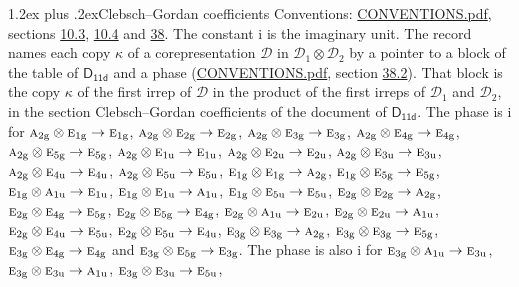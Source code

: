 \documentclass[10pt,a4paper]{article}
\makeatletter
\renewcommand\section{\@startsection{section}{1}{\z@}{-3ex plus -1ex minus -.2ex}%
  {1.2ex plus .2ex}{\normalfont\large\sffamily\bfseries\color{parttitle}}}
\numberwithin{equation}{section}
\newcommand{\grp}[1]{\mathsf{#1}}
\newcommand{\irr}[1]{\text{\normalfont\scshape #1}}
\newcommand{\ptag}[1]{\mathrm{#1}}
\newcommand{\iunit}{\mathrm{i}}
\newcommand{\irrprod}{\otimes}
\newcommand{\mult}{\kappa}
\makeatother
\begin{document}
\section{Clebsch--Gordan coefficients}\label{s:clebsch_gordan}
Conventions: \href{../../CONVENTIONS.pdf}{CONVENTIONS.pdf}, sections \href{../../../rotation/CONVENTIONS.pdf\#conv.10.3}{10.3}, \href{../../../rotation/CONVENTIONS.pdf\#conv.10.4}{10.4} and \href{../../CONVENTIONS.pdf\#conv.38}{38}.
The constant $\iunit$ is the imaginary unit.
\leavevmode\label{n:index.copy}The record names each copy $\mult$ of a corepresentation $\mathcal{D}$ in $\mathcal{D}_1\irrprod\mathcal{D}_2$ by a pointer to a block of the table of $\grp{D_{11d}}$ and a phase (\href{../../CONVENTIONS.pdf}{CONVENTIONS.pdf}, section \href{../../CONVENTIONS.pdf\#conv.38.2}{38.2}). That block is the copy $\mult$ of the first irrep of $\mathcal{D}$ in the product of the first irreps of $\mathcal{D}_1$ and $\mathcal{D}_2$, in the section Clebsch--Gordan coefficients of the document of \href{../../../rotation/data/pdf/D11d.pdf}{$\grp{D_{11d}}$}. The phase is $\iunit$ for $\irr{a}_{2\ptag{g}}\irrprod \irr{e}_{1\ptag{g}}\to \irr{e}_{1\ptag{g}}$, $\irr{a}_{2\ptag{g}}\irrprod \irr{e}_{2\ptag{g}}\to \irr{e}_{2\ptag{g}}$, $\irr{a}_{2\ptag{g}}\irrprod \irr{e}_{3\ptag{g}}\to \irr{e}_{3\ptag{g}}$, $\irr{a}_{2\ptag{g}}\irrprod \irr{e}_{4\ptag{g}}\to \irr{e}_{4\ptag{g}}$, $\irr{a}_{2\ptag{g}}\irrprod \irr{e}_{5\ptag{g}}\to \irr{e}_{5\ptag{g}}$, $\irr{a}_{2\ptag{g}}\irrprod \irr{e}_{1\ptag{u}}\to \irr{e}_{1\ptag{u}}$, $\irr{a}_{2\ptag{g}}\irrprod \irr{e}_{2\ptag{u}}\to \irr{e}_{2\ptag{u}}$, $\irr{a}_{2\ptag{g}}\irrprod \irr{e}_{3\ptag{u}}\to \irr{e}_{3\ptag{u}}$, $\irr{a}_{2\ptag{g}}\irrprod \irr{e}_{4\ptag{u}}\to \irr{e}_{4\ptag{u}}$, $\irr{a}_{2\ptag{g}}\irrprod \irr{e}_{5\ptag{u}}\to \irr{e}_{5\ptag{u}}$, $\irr{e}_{1\ptag{g}}\irrprod \irr{e}_{1\ptag{g}}\to \irr{a}_{2\ptag{g}}$, $\irr{e}_{1\ptag{g}}\irrprod \irr{e}_{5\ptag{g}}\to \irr{e}_{5\ptag{g}}$, $\irr{e}_{1\ptag{g}}\irrprod \irr{a}_{1\ptag{u}}\to \irr{e}_{1\ptag{u}}$, $\irr{e}_{1\ptag{g}}\irrprod \irr{e}_{1\ptag{u}}\to \irr{a}_{1\ptag{u}}$, $\irr{e}_{1\ptag{g}}\irrprod \irr{e}_{5\ptag{u}}\to \irr{e}_{5\ptag{u}}$, $\irr{e}_{2\ptag{g}}\irrprod \irr{e}_{2\ptag{g}}\to \irr{a}_{2\ptag{g}}$, $\irr{e}_{2\ptag{g}}\irrprod \irr{e}_{4\ptag{g}}\to \irr{e}_{5\ptag{g}}$, $\irr{e}_{2\ptag{g}}\irrprod \irr{e}_{5\ptag{g}}\to \irr{e}_{4\ptag{g}}$, $\irr{e}_{2\ptag{g}}\irrprod \irr{a}_{1\ptag{u}}\to \irr{e}_{2\ptag{u}}$, $\irr{e}_{2\ptag{g}}\irrprod \irr{e}_{2\ptag{u}}\to \irr{a}_{1\ptag{u}}$, $\irr{e}_{2\ptag{g}}\irrprod \irr{e}_{4\ptag{u}}\to \irr{e}_{5\ptag{u}}$, $\irr{e}_{2\ptag{g}}\irrprod \irr{e}_{5\ptag{u}}\to \irr{e}_{4\ptag{u}}$, $\irr{e}_{3\ptag{g}}\irrprod \irr{e}_{3\ptag{g}}\to \irr{a}_{2\ptag{g}}$, $\irr{e}_{3\ptag{g}}\irrprod \irr{e}_{3\ptag{g}}\to \irr{e}_{5\ptag{g}}$, $\irr{e}_{3\ptag{g}}\irrprod \irr{e}_{4\ptag{g}}\to \irr{e}_{4\ptag{g}}$ and $\irr{e}_{3\ptag{g}}\irrprod \irr{e}_{5\ptag{g}}\to \irr{e}_{3\ptag{g}}$. The phase is also $\iunit$ for $\irr{e}_{3\ptag{g}}\irrprod \irr{a}_{1\ptag{u}}\to \irr{e}_{3\ptag{u}}$, $\irr{e}_{3\ptag{g}}\irrprod \irr{e}_{3\ptag{u}}\to \irr{a}_{1\ptag{u}}$, $\irr{e}_{3\ptag{g}}\irrprod \irr{e}_{3\ptag{u}}\to \irr{e}_{5\ptag{u}}$, 
\end{document}
